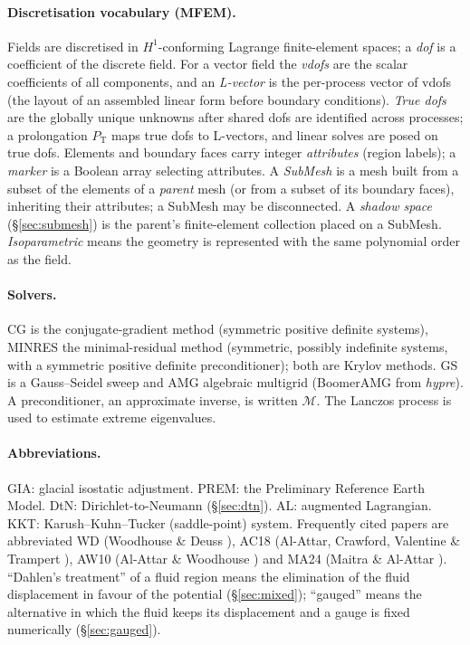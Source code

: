 \documentclass[11pt]{article}
\numberwithin{equation}{section}
\theoremstyle{remark}
\begin{document}
\paragraph{Discretisation vocabulary (MFEM).} Fields are discretised in
$H^1$-conforming Lagrange finite-element spaces; a \emph{dof} is a
coefficient of the discrete field. For a vector field the \emph{vdofs} are
the scalar coefficients of all components, and an \emph{L-vector} is the
per-process vector of vdofs (the layout of an assembled linear form before
boundary conditions). \emph{True dofs} are the globally unique unknowns
after shared dofs are identified across processes; a prolongation
$P_{\mathrm{T}}$ maps true dofs to L-vectors, and linear solves are posed
on true dofs. Elements and boundary faces carry integer
\emph{attributes} (region labels); a \emph{marker} is a Boolean array
selecting attributes. A \emph{SubMesh} is a mesh built from a subset of
the elements of a \emph{parent} mesh (or from a subset of its boundary
faces), inheriting their attributes; a SubMesh may be disconnected. A
\emph{shadow space} (\S\ref{sec:submesh}) is the parent's finite-element
collection placed on a SubMesh. \emph{Isoparametric} means the geometry is
represented with the same polynomial order as the field.

\paragraph{Solvers.} CG is the conjugate-gradient method (symmetric
positive definite systems), MINRES the minimal-residual method (symmetric,
possibly indefinite systems, with a symmetric positive definite
preconditioner); both are Krylov methods. GS is a Gauss--Seidel sweep and
AMG algebraic multigrid (BoomerAMG from \emph{hypre}). A preconditioner, an
approximate inverse, is written $\mathcal{M}$. The Lanczos process is used
to estimate extreme eigenvalues.

\paragraph{Abbreviations.} GIA: glacial isostatic adjustment. PREM: the
Preliminary Reference Earth Model. DtN: Dirichlet-to-Neumann
(\S\ref{sec:dtn}). AL: augmented Lagrangian. KKT: Karush--Kuhn--Tucker
(saddle-point) system. Frequently cited papers are abbreviated WD
(Woodhouse \& Deuss \cite{WoodhouseDeuss2007}), AC18 (Al-Attar, Crawford,
Valentine \& Trampert \cite{AC18}), AW10 (Al-Attar \& Woodhouse
\cite{AW10}) and MA24 (Maitra \& Al-Attar \cite{MaitraAlAttar2024}).
``Dahlen's treatment'' of a fluid region means the elimination of the
fluid displacement in favour of the potential (\S\ref{sec:mixed});
``gauged'' means the alternative in which the fluid keeps its displacement
and a gauge is fixed numerically (\S\ref{sec:gauged}).
\end{document}

